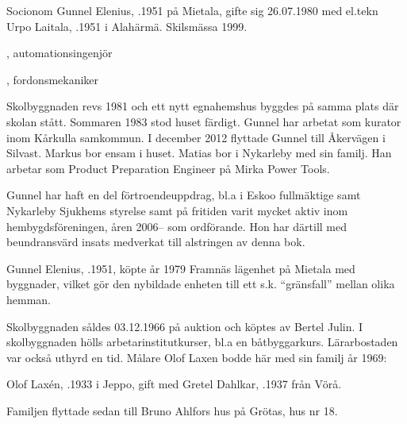 Socionom Gunnel Elenius, .1951 på Mietala, gifte sig 26.07.1980 med el.tekn Urpo Laitala, .1951 i Alahärmä. Skilsmässa 1999.
\begin{jhchildren}
  \item {}, automationsingenjör
  \item {}, fordonsmekaniker
\end{jhchildren}

Skolbyggnaden revs 1981 och ett nytt egnahemshus byggdes på samma plats där skolan stått. Sommaren 1983 stod huset färdigt. Gunnel har arbetat som kurator inom Kårkulla samkommun. I december 2012 flyttade Gunnel till Åkervägen i Silvast. Markus bor ensam i huset. Matias bor i Nykarleby med sin familj. Han arbetar som Product Preparation Engineer på Mirka Power Tools.

Gunnel har haft en del förtroendeuppdrag, bl.a i  Eskoo fullmäktige samt Nykarleby Sjukhems styrelse samt på fritiden varit mycket aktiv inom hembygdsföreningen, åren 2006-- som ordförande. Hon har därtill med beundransvärd insats medverkat till alstringen av denna bok.





Gunnel Elenius, .1951, köpte år 1979 Framnäs lägenhet på Mietala med byggnader, vilket gör den nybildade enheten till ett s.k. ``gränsfall'' mellan olika hemman.\jhvspace{}


Skolbyggnaden såldes 03.12.1966 på auktion och köptes av Bertel Julin. I skolbyggnaden hölls arbetarinstitutkurser, bl.a en båtbyggarkurs. Lärarbostaden var också uthyrd en tid. Målare Olof Laxen bodde här med sin familj år 1969:

Olof Laxén, .1933 i Jeppo, gift med Gretel Dahlkar, .1937 från Vörå.
\begin{jhchildren}
  \item {}
  \item {}
\end{jhchildren}

Familjen flyttade sedan till Bruno Ahlfors hus på Grötas, hus nr 18.


